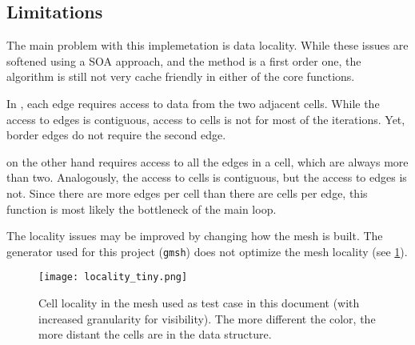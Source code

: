 \subsection{Limitations}

The main problem with this implemetation is data locality. While these issues are softened using a SOA approach, and the method is a first order one, the algorithm is still not very cache friendly in either of the core functions.

In \computeflux, each edge requires access to data from the two adjacent cells. While the access to edges is contiguous, access to cells is not for most of the iterations. Yet, border edges do not require the second edge.

\update on the other hand requires access to all the edges in a cell, which are always more than two. Analogously, the access to cells is contiguous, but the access to edges is not. Since there are more edges per cell than there are cells per edge, this function is most likely the bottleneck of the main loop.

The locality issues may be improved by changing how the mesh is built. The generator used for this project (\texttt{gmsh}) does not optimize the mesh locality (see \cref{fig:locality}).


\begin{figure}[!htp]
	\centering
	\texttt{[image: locality\_tiny.png]}
	\caption{Cell locality in the mesh used as test case in this document (with increased granularity for visibility). The more different the color, the more distant the cells are in the data structure.}
	\label{fig:locality}
\end{figure}
